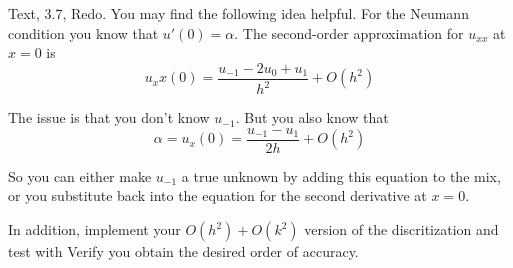 \documentclass[minion]{homework}
\begin{document}
\begin{problems}
\problem Text, 3.7, Redo.  You may find the following idea helpful.
For the Neumann condition you know that $u'(0)=\alpha$.  The second-order approximation for $u_{xx}$ at $x=0$ is
\[
u_xx(0) = \frac{u_{-1}-2u_0 + u_1}{h^2} + O(h^2)
\]

The issue is that you don't know $u_{-1}$.  But you also know that
\[
\alpha = u_x(0) = \frac{u_{-1}-u_1}{2h} + O(h^2)
\]

So you can either make $u_{-1}$ a true unknown by adding this equation to the mix, or you substitute back into the equation for the second derivative at $x=0$.

In addition, implement your $O(h^2)+O(k^2)$ version of the discritization
and test with 
Verify you obtain the desired order of accuracy.

\end{problems}
\end{document}
